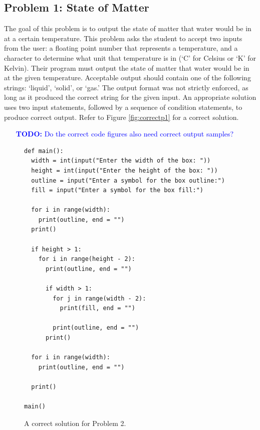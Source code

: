 \subsection{Problem 1: State of Matter}
The goal of this problem is to output the state of matter that water would be in at a certain temperature. This problem asks the student to accept two inputs from the user: a floating point number that represents a temperature, and a character to determine what unit that temperature is in (`C' for Celsius or `K' for Kelvin). Their program must output the state of matter that water would be in at the given temperature. Acceptable output should contain one of the following strings: `liquid', `solid', or `gas.' The output format was not strictly enforced, as long as it produced the correct string for the given input. An appropriate solution uses two input statements, followed by a sequence of condition statements, to produce correct output. Refer to Figure \ref{fig:correctp1} for a correct solution.

\textcolor{blue}{
\begin{itemize}
    \itemsep-1.5em 
    \item [\textbf{TODO:}] Do the correct code figures also need correct output samples?
\end{itemize}}


\begin{figure}[ht]
\begin{lstlisting}[numbers=none]
def main():
  width = int(input("Enter the width of the box: "))
  height = int(input("Enter the height of the box: "))
  outline = input("Enter a symbol for the box outline:")
  fill = input("Enter a symbol for the box fill:")

  for i in range(width):
    print(outline, end = "")
  print()

  if height > 1:
    for i in range(height - 2):
      print(outline, end = "")

      if width > 1:
        for j in range(width - 2):
          print(fill, end = "")

        print(outline, end = "")
      print()

  for i in range(width):
    print(outline, end = "")

  print()

main()
  \end{lstlisting}
  \caption{A correct solution for Problem 2.}
  \label{fig:correctp2}
\end{figure}

